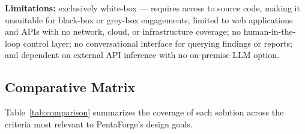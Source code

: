 \documentclass[12pt,a4paper]{report}
\begin{document}
\textbf{Limitations:} exclusively white-box --- requires access to source code,
making it unsuitable for black-box or grey-box engagements; limited to web
applications and APIs with no network, cloud, or infrastructure coverage; no
human-in-the-loop control layer; no conversational interface for querying findings
or reports; and dependent on external API inference with no on-premise LLM option.

\subsection{Comparative Matrix}

Table~\ref{tab:comparison} summarizes the coverage of each solution across the
criteria most relevant to PentaForge's design goals.

\begin{table}[H]
    \centering
    \caption{Comparative analysis of existing automated penetration testing solutions}
    \label{tab:comparison}
    \scriptsize
    \setlength{\tabcolsep}{4pt}
    \renewcommand{\arraystretch}{1.55}
\end{table}
\end{document}
